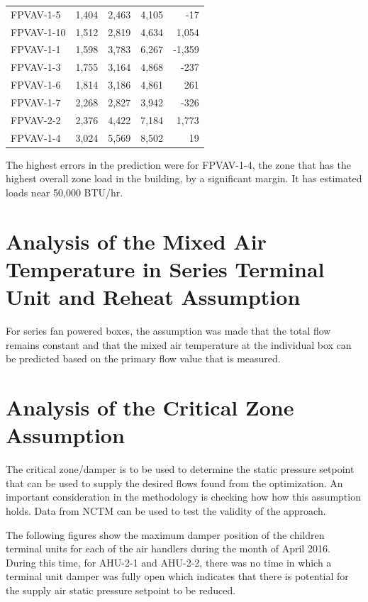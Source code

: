 \begin{table}[]
\begin{tabular}{lrrrr}
FPVAV-1-5 & 1,404 & 2,463 & 4,105 & -17 \\ 
FPVAV-1-10 & 1,512 & 2,819 & 4,634 & 1,054 \\ 
FPVAV-1-1 & 1,598 & 3,783 & 6,267 & -1,359 \\ 
FPVAV-1-3 & 1,755 & 3,164 & 4,868 & -237 \\ 
FPVAV-1-6 & 1,814 & 3,186 & 4,861 & 261 \\ 
FPVAV-1-7 & 2,268 & 2,827 & 3,942 & -326 \\ 
FPVAV-2-2 & 2,376 & 4,422 & 7,184 & 1,773 \\ 
FPVAV-1-4 & 3,024 & 5,569 & 8,502 & 19 \\ 
    \bottomrule
\end{tabular}
\end{table}

The highest errors in the prediction were for FPVAV-1-4, the zone that has the highest overall zone load in the building, by a significant margin. It has estimated loads near 50,000 BTU/hr.


\section{Analysis of the Mixed Air Temperature in Series Terminal Unit and Reheat Assumption}

For series fan powered boxes, the assumption was made that the total flow remains constant and that the mixed air temperature at the individual box can be predicted based on the primary flow value that is measured. 


\section{Analysis of the Critical Zone Assumption}

The critical zone/damper is to be used to determine the static pressure setpoint that can be used to supply the desired flows found from the optimization. An important consideration in the methodology is checking how how this assumption holds. Data from NCTM can be used to test the validity of the approach.

The following figures show the maximum damper position of the children terminal units for each of the air handlers during the month of April 2016. During this time, for AHU-2-1 and AHU-2-2, there was no time in which a terminal unit damper was fully open which indicates that there is potential for the supply air static pressure setpoint to be reduced.  

